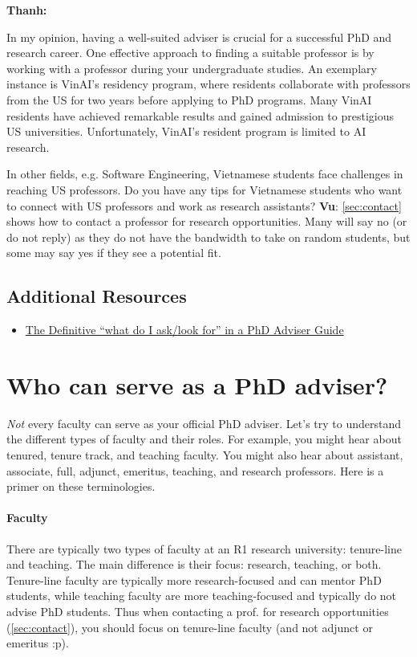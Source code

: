 \documentclass[oneside,11pt,dvipsnames]{book}
\newenvironment{commentbox}[1][]{
  \small
  \begin{mybox}
    {\small \textbf{#1}}
  }{
  \end{mybox}
}
\begin{document}
\begin{commentbox}[Thanh:]
  In my opinion, having a well-suited adviser is crucial for a successful PhD and research career. One effective approach to finding a suitable professor is by working with a professor during your undergraduate studies. An exemplary instance is VinAI's residency program, where residents collaborate with professors from the US for two years before applying to PhD programs. Many VinAI residents have achieved remarkable results and gained admission to prestigious US universities. Unfortunately, VinAI's resident program is limited to AI research.

  In other fields, e.g. Software Engineering, Vietnamese students face challenges in reaching US professors. Do you have any tips for Vietnamese students who want to connect with US professors and work as research assistants?
  \tcblower
  \textbf{Vu}: \autoref{sec:contact} shows how to contact a professor for research opportunities. Many will say no (or do not reply) as they do not have the bandwidth to take on random students, but some may say yes if they see a potential fit.
\end{commentbox}

\subsection*{Additional Resources}
\begin{itemize}
  \item \href{https://www.cs.columbia.edu/wp-content/uploads/2019/03/Get-Advisor.pdf}{The Definitive ``what do I ask/look for'' in a PhD Adviser Guide}
\end{itemize}

\section{Who can serve as a PhD adviser?}\label{sec:faculty-types}

\emph{Not} every faculty can serve as your official PhD adviser. Let's try to understand the different types of faculty and their roles. For example, you might hear about tenured,  tenure track, and teaching faculty.  You might also hear about assistant, associate, full, adjunct, emeritus, teaching, and research professors. Here is a primer on these terminologies.

\paragraph{Faculty} There are typically two types of faculty at an R1 research university: tenure-line and teaching.  The main difference is their focus: research, teaching, or both. Tenure-line faculty are typically more research-focused and can mentor PhD students, while teaching faculty are more teaching-focused and typically do not advise PhD students. Thus when contacting a prof. for research opportunities (\autoref{sec:contact}), you should focus on tenure-line faculty (and not adjunct or emeritus :p).
\end{document}

